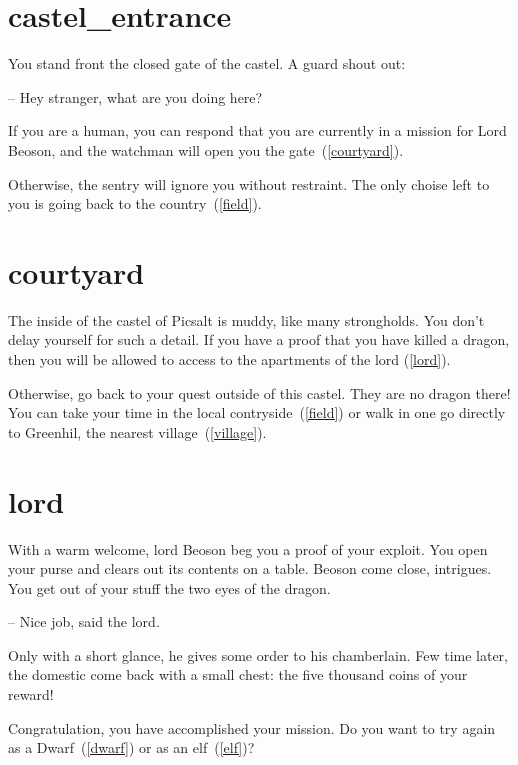 \section{castel_entrance}

You stand front the closed gate of the castel. A guard shout out:

-- Hey stranger, what are you doing here?

If you are a human, you can respond that you are currently in a mission for Lord
Beoson, and the watchman will open you the gate~(\ref{courtyard}).

Otherwise, the sentry will ignore you without restraint. The only choise
left to you is going back to the country~(\ref{field}).

\section{courtyard}

The inside of the castel of Picsalt is muddy, like many strongholds. You don't
delay yourself for such a detail. If you have a proof that you have killed a
dragon, then you will be allowed to access to the apartments of the lord
(\ref{lord}).

Otherwise, go back to your quest outside of this castel. They are no dragon
there! You can take your time in the local contryside~(\ref{field}) or walk in
one go directly to Greenhil, the nearest village~(\ref{village}).

\section{lord}

With a warm welcome, lord Beoson beg you a proof of your exploit.  You open
your purse and clears out its contents on a table. Beoson come close,
intrigues. You get out of your stuff the two eyes of the dragon.

-- Nice job, said the lord.

Only with a short glance, he gives some order to his chamberlain. Few time
later, the domestic come back with a small chest: the five thousand coins of
your reward!

\medbreak

Congratulation, you have accomplished your mission. Do you want to try again as a
Dwarf~(\ref{dwarf}) or as an elf~(\ref{elf})?
